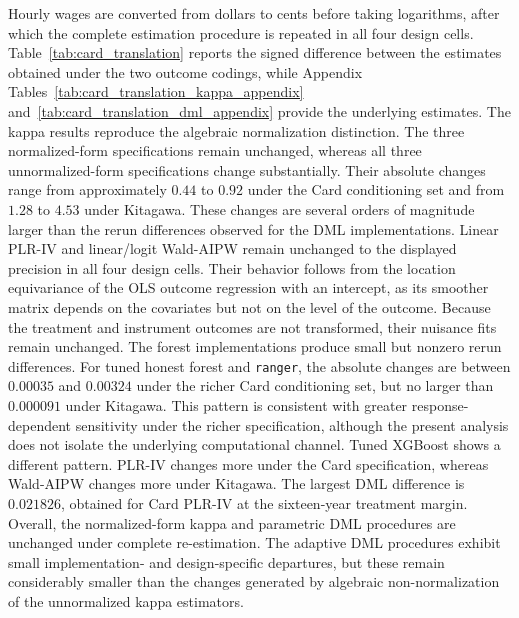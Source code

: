 \documentclass[12pt, a4paper, oneside]{article}
\theoremstyle{plain}
\theoremstyle{definition}
\begin{document}
Hourly wages are converted from dollars to cents before taking logarithms, after which the complete estimation procedure is repeated in all four design cells.
Table~\ref{tab:card_translation} reports the signed difference between the estimates obtained under the two outcome codings, while Appendix Tables~\ref{tab:card_translation_kappa_appendix} and~\ref{tab:card_translation_dml_appendix} provide the underlying estimates.
The kappa results reproduce the algebraic normalization distinction. The three normalized-form specifications remain unchanged, whereas all three unnormalized-form specifications change substantially.
Their absolute changes range from approximately \(0.44\) to \(0.92\) under the Card conditioning set and from \(1.28\) to \(4.53\) under Kitagawa. These changes are several orders of magnitude larger than the rerun differences observed for the DML implementations.
Linear PLR-IV and linear/logit Wald-AIPW remain unchanged to the displayed precision in all four design cells. Their behavior follows from the location equivariance of the OLS outcome regression with an intercept, as its smoother matrix depends on the covariates but not on the level of the outcome.
Because the treatment and instrument outcomes are not transformed, their nuisance fits remain unchanged.
The forest implementations produce small but nonzero rerun differences. For tuned honest forest and \texttt{ranger}, the absolute changes are between \(0.00035\) and \(0.00324\) under the richer Card conditioning set, but no larger than \(0.000091\) under Kitagawa. This pattern is consistent with greater response-dependent sensitivity under the richer specification, although the present analysis does not isolate the underlying computational channel.
Tuned XGBoost shows a different pattern.
PLR-IV changes more under the Card specification, whereas Wald-AIPW changes more under Kitagawa. The largest DML difference is \(0.021826\), obtained for Card PLR-IV at the sixteen-year treatment margin.
Overall, the normalized-form kappa and parametric DML procedures are unchanged under complete re-estimation. The adaptive DML procedures exhibit small implementation- and design-specific departures, but these remain considerably smaller than the changes generated by algebraic non-normalization of the unnormalized kappa estimators.
\end{document}
